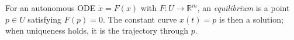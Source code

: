 
For an autonomous ODE $\dot x=F(x)$ with $F:U\to\mathbb R^m$, an \emph{equilibrium} is a point $p\in U$ satisfying $F(p)=0$. The constant curve $x(t)=p$ is then a solution; when uniqueness holds, it is the trajectory through $p$.
